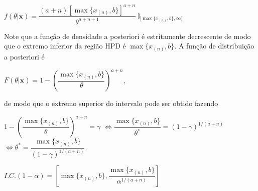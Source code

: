 \documentclass[
]{book}
\begin{document}
\(f(\theta|\boldsymbol x) =\dfrac{(a+n)[\max\{x_{(n)},b\}]^{a+n}}{\theta^{a+n+1}}~\mathbb I_{[\max\{x_{(n)},b\},\infty)}\)

Note que a função de densidade a posteriori é estritamente decrescente de modo que o extremo inferior da região HPD é \(\max\{x_{(n)},b\}\). A função de distribuição a posteriori é

\(F(\theta|\boldsymbol x)=1-\left(\dfrac{\max\{x_{(n)},b\}}{\theta}\right)^{a+n}\),

de modo que o extremo superior do intervalo pode ser obtido fazendo

\(1-\left(\dfrac{\max\{x_{(n)},b\}}{\theta}\right)^{a+n}=\gamma\) \(\Leftrightarrow\dfrac{\max\{x_{(n)},b\}}{\theta^*}=(1-\gamma)^{1/(a+n)}\) \(\Leftrightarrow \theta^*=\dfrac{\max\{x_{(n)},b\}}{(1-\gamma)^{1/(a+n)}}\).

\(I.C.(1-\alpha)=\left[\max\{x_{(n)},b\},\dfrac{\max\{x_{(n)},b\}}{\alpha^{1/(a+n)}}\right]\)
\end{document}
